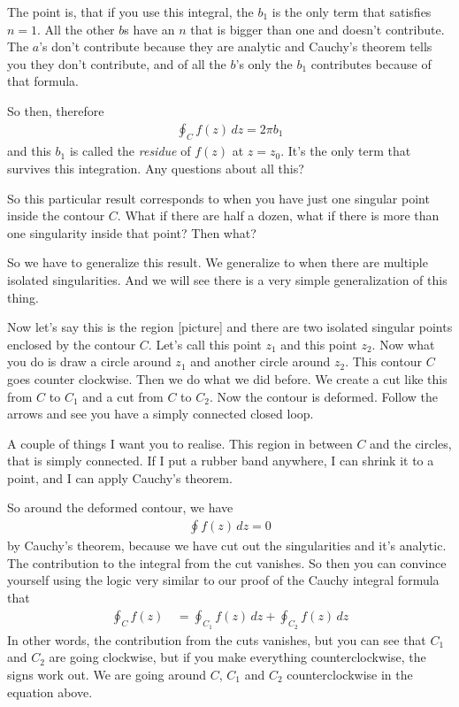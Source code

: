 The point is,
that if you use this integral,
the $b_1$ is the only term that satisfies $n=1$.
All the other $b$s have an $n$ that is bigger than one and doesn't contribute.
The $a$'s don't contribute because they are analytic and Cauchy's theorem tells
you they don't contribute,
and of all the $b$'s only the $b_1$ contributes because of that formula.

So then, therefore
\begin{align}
    \oint_C f(z)\, dz = 2\pi b_1
\end{align}
and this $b_1$ is called the \emph{residue} of $f(z)$ at $z=z_0$.
It's the only term that survives this integration.
Any questions about all this?

So this particular result corresponds to when you have just one singular point
inside the contour $C$.
What if there are half a dozen,
what if there is more than one singularity inside that point?
Then what?

So we have to generalize this result.
We generalize to when there are multiple isolated singularities.
And we will see there is a very simple generalization of this thing.

Now let's say this is the region [picture]
and there are two isolated singular points enclosed by the contour $C$.
Let's call this point $z_1$ and this point $z_2$.
Now what you do is draw a circle around $z_1$
and another circle around $z_2$.
This contour $C$ goes counter clockwise.
Then we do what we did before.
We create a cut like this from $C$ to $C_1$ and a cut from $C$ to $C_2$.
Now the contour is deformed.
Follow the arrows and see you have a simply connected closed loop.

A couple of things I want you to realise.
This region in between $C$ and the circles,
that is simply connected.
If I put a rubber band anywhere,
I can shrink it to a point,
and I can apply Cauchy's theorem.

So around the deformed contour,
we have
\begin{align}
    \oint f(z)\, dz = 0
\end{align}
by Cauchy's theorem,
because we have cut out the singularities and it's analytic.
The contribution to the integral from the cut vanishes.
So then you can convince yourself using the logic very similar to our proof of
the Cauchy integral formula that
\begin{align}
    \oint_C f(z) \, &=
    \oint_{C_1} f(z)\,dz
    + \oint_{C_2} f(z)\, dz
\end{align}
In other words,
the contribution from the cuts vanishes,
but you can see that $C_1$ and $C_2$ are going clockwise,
but if you make everything counterclockwise,
the signs work out.
We are going around $C$, $C_1$ and $C_2$ counterclockwise
in the equation above.

